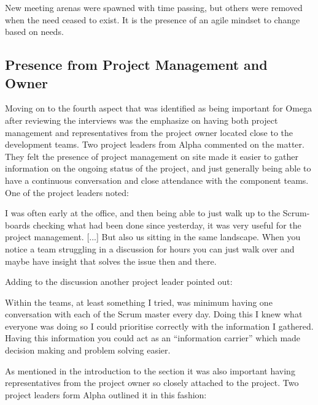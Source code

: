 \begin{fancyquotes}
New meeting arenas were spawned with time passing, but others were removed when the need ceased to exist. It is the presence of an agile mindset to change based on needs.
\end{fancyquotes}

\subsection{Presence from Project Management and Owner}

Moving on to the fourth aspect that was identified as being important for Omega after reviewing the interviews was the emphasize on having both project management and representatives from the project owner located close to the development teams. Two project leaders from Alpha commented on the matter. They felt the presence of project management on site made it easier to gather information on the ongoing status of the project, and just generally being able to have a continuous conversation and close attendance with the component teams. One of the project leaders noted:

\begin{fancyquotes}
I was often early at the office, and then being able to just walk up to the Scrum-boards checking what had been done since yesterday, it was very useful for the project management. [...] But also us sitting in the same landscape. When you notice a team struggling in a discussion for hours you can just walk over and maybe have insight that solves the issue then and there.
\end{fancyquotes}

Adding to the discussion another project leader pointed out:

\begin{fancyquotes}
Within the teams, at least something I tried, was minimum having one conversation with each of the Scrum master every day. Doing this I knew what everyone was doing so I could prioritise correctly with the information I gathered. Having this information you could act as an ``information carrier'' which made decision making and problem solving easier.
\end{fancyquotes}

As mentioned in the introduction to the section it was also important having representatives from the project owner so closely attached to the project. Two project leaders form Alpha outlined it in this fashion:

